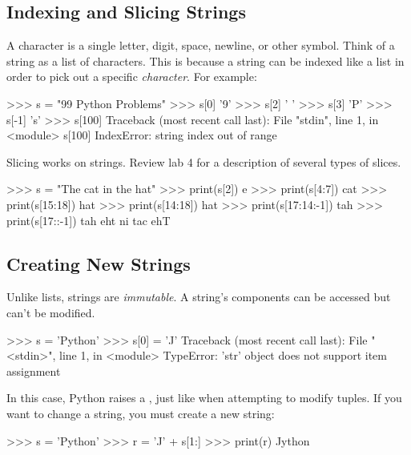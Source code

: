 \documentclass[11pt]{cselabheader}
\begin{document}
\subsection{Indexing and Slicing Strings}

A character is a single letter, digit, space, newline, or other symbol.
Think of a string as a list of characters.
This is because a string can be indexed like a list in order to pick out a specific \emph{character}.
For example:

\begin{pyconcode}
>>> s = "99 Python Problems"
>>> s[0]
'9'
>>> s[2]
' '
>>> s[3]
'P'
>>> s[-1]
's'
>>> s[100]
Traceback (most recent call last):
  File "stdin", line 1, in <module>
    s[100]
IndexError: string index out of range

\end{pyconcode}

Slicing works on strings. Review lab 4 for a
description of several types of slices.

\begin{pyconcode}
>>> s = "The cat in the hat"
>>> print(s[2])
e
>>> print(s[4:7])
cat
>>> print(s[15:18])
hat
>>> print(s[14:18])
 hat
>>> print(s[17:14:-1])
tah
>>> print(s[17::-1])
tah eht ni tac ehT

\end{pyconcode}

\subsection{Creating New Strings}

Unlike lists, strings are \emph{immutable}. A
string's components can be accessed but can't be
modified.

\begin{pyconcode}
>>> s = 'Python'
>>> s[0] = 'J'
Traceback (most recent call last):
  File "<stdin>", line 1, in <module>
TypeError: 'str' object does not support item assignment

\end{pyconcode}

In this case, Python raises a , just like when
attempting to modify tuples.
If you want to change a string, you must create a new string:

\begin{pyconcode}
>>> s = 'Python'
>>> r = 'J' + s[1:]
>>> print(r)
Jython

\end{pyconcode}
\end{document}
